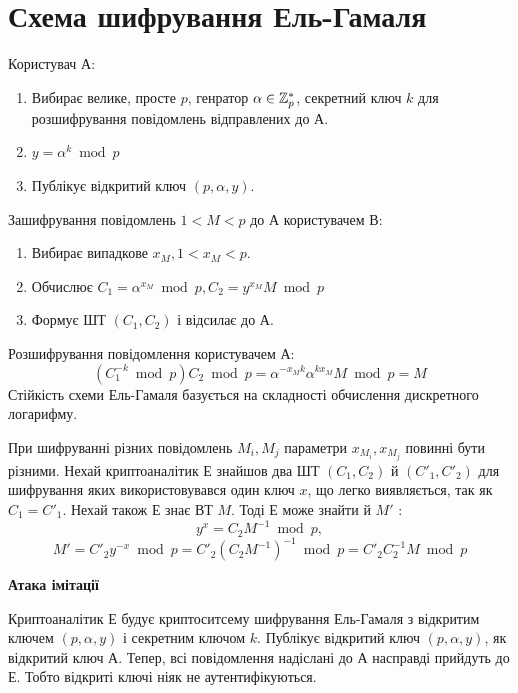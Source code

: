 \section{Схема шифрування Ель-Гамаля}
Користувач А:
\begin{enumerate}
\item 
Вибирає велике, просте  $p$, генратор $\alpha \in \mathbb Z^{*}_{p}$, 
секретний ключ $k$ для розшифрування повідомлень відправлених до А.
\item 
$ y=\alpha^k\bmod{p}$
\item 
Публікує відкритий ключ $(p, \alpha, y)$.
\end{enumerate}
Зашифрування повідомлень $1<M<p$ до А користувачем В:
\begin{enumerate}
\item 
Вибирає випадкове $x_{M}, 1<x_{M}<p$. 
\item 
Обчислює $C_{1}=\alpha^{x_{M}}\bmod{p}, C_{2}=y^{x_{M}}M\bmod{p}$
\item
Формує ШТ $(C_{1},  C_{2})$ і відсилає до А.
\end{enumerate}
Розшифрування повідомлення користувачем А:
\[ (C_{1}^{-k}\bmod{p})C_{2}\bmod{p}= \alpha^{-x_{M}k}\alpha^{kx_{M}}M\bmod{p}=M \]
Стійкість схеми Ель-Гамаля базується на складності обчислення дискретного логарифму.\par
\begin{remark}
При шифруванні різних повідомлень $M_{i}, M_{j}$ параметри $x_{M_{i}}, x_{M_{j}}$ повинні бути різними.
Нехай криптоаналітик Е знайшов два ШТ \( (C_{1},  C_{2}) \) й \( (C'_{1},  C'_{2}) \) для шифрування яких використовувався один ключ $x$, що легко виявляється, так як  \(C_{1}=C'_{1}\).
Нехай також Е знає ВТ \(M\). Тоді Е може знайти й \( M' \) : 
\[ y^x = C_2 M^{-1} \bmod{p},\]
\[M'=C'_{2}y^{-x}\bmod{p}=C'_{2}(C_{2} M^{-1})^{-1}\bmod{p}=C'_{2}C_{2}^{-1} M \bmod{p} \]
\end{remark}
\textbf{Атака імітації}\par
Криптоаналітик Е будує криптоситсему шифрування Ель-Гамаля з відкритим ключем $(p,\alpha,y)$ і секретним ключом $k$.
Публікує відкритий ключ $(p,\alpha,y)$, як відкритий ключ А. Тепер, всі повідомлення надіслані до А насправді прийдуть до Е.
Тобто відкриті ключі ніяк не аутентифікуються.\par

